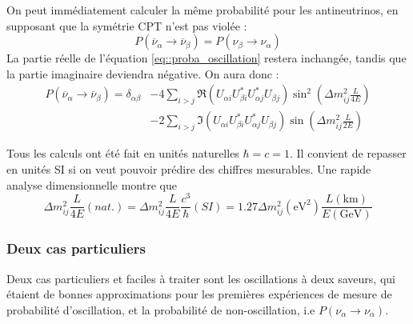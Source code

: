             On peut immédiatement calculer la même probabilité pour les antineutrinos, en supposant que la symétrie CPT n'est pas violée : 
            \begin{equation}
                P(\overline{\nu}_{\alpha}\to\overline{\nu}_{\beta}) = P(\nu_{\beta}\to\nu_{\alpha})
            \end{equation}
            La partie réelle de l'équation \eqref{eq::proba_oscillation} restera inchangée, tandis que la partie imaginaire deviendra négative. On aura donc :
            \begin{equation}
                \begin{split}
                    P(\overline{\nu}_{\alpha}\to\overline{\nu}_{\beta}) = \delta_{\alpha\beta} & - 4\sum_{i>j}\Re(U_{\alpha i}U_{\beta i}^*U_{\alpha j}^*U_{\beta j})\sin^2\left(\Delta m_{ij}^2\frac{L}{4E}\right) \\
                    & -2\sum_{i>j}\Im(U_{\alpha i}U_{\beta i}^*U_{\alpha j}^*U_{\beta j})\sin\left(\Delta m_{ij}^2\frac{L}{2E}\right)
                \end{split}
            \end{equation}
            
            Tous les calculs ont été fait en unités naturelles $\hbar = c = 1$. Il convient de repasser en unités SI si on veut pouvoir prédire des chiffres mesurables. Une rapide analyse dimensionnelle montre que 
            \begin{equation}
                \Delta m_{ij}^2\frac{L}{4E}(nat.)
                =\Delta m_{ij}^2\frac{L}{4E}\frac{c^3}{\hbar}(SI)
                =1.27\Delta m_{ij}^2(\si{\electronvolt\squared})\frac{L(\si{\kilo\meter})}{E(\si{\giga\electronvolt})}
            \end{equation}
            
        \subsubsection{Deux cas particuliers}
            Deux cas particuliers et faciles à traiter sont les oscillations à deux saveurs, qui étaient de bonnes approximations pour les premières expériences de mesure de probabilité d'oscillation, et la probabilité de non-oscillation, i.e $P(\nu_{\alpha}\to\nu_{\alpha})$.
            
